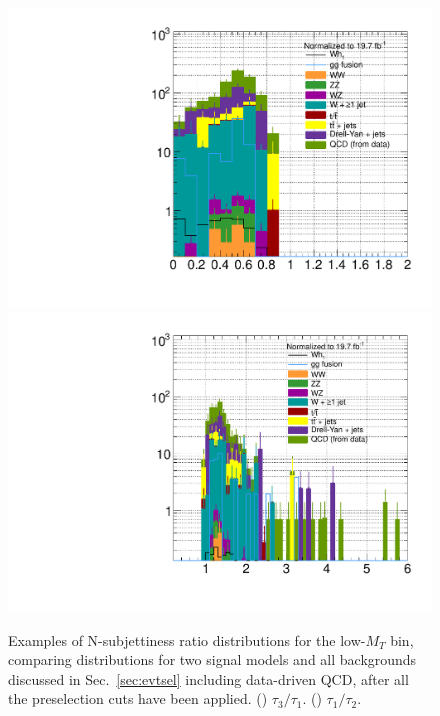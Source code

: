 \begin{figure}[hbtp]
  \begin{center}
    \includegraphics[width=1.2\cmsFigWidth]{figures/sigVsBkg_t3t1_lowMT}
    \includegraphics[width=1.2\cmsFigWidth]{figures/sigVsBkg_t1t2_lowMT}
    \caption{Examples of N-subjettiness ratio distributions for the low-$M_{T}$ bin, comparing distributions for two signal models and all backgrounds discussed in Sec.~\ref{sec:evtsel} including data-driven QCD, after all the preselection cuts have been applied. (\cmsLeft) $\tau_{3}/\tau_{1}$. (\cmsRight) $\tau_{1}/\tau_{2}$.}
    \label{fig:nsubjettiness-ratios-lowMT}
  \end{center}
\end{figure}

